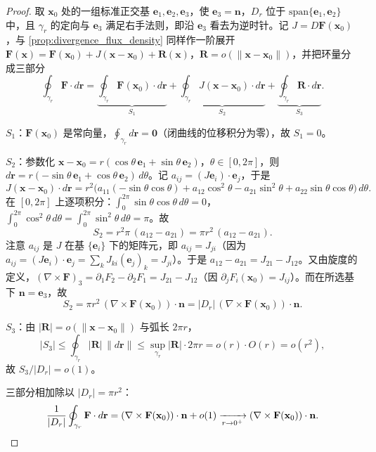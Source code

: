 \begin{proof}
取 $\mathbf x_0$ 处的一组标准正交基 $\mathbf e_1,\mathbf e_2,\mathbf e_3$，使 $\mathbf e_3 = \mathbf n$，$D_r$ 位于 $\mathrm{span}\{\mathbf e_1,\mathbf e_2\}$ 中，且 $\gamma_r$ 的定向与 $\mathbf e_3$ 满足右手法则，即沿 $\mathbf e_3$ 看去为逆时针。记 $J = D\mathbf F(\mathbf x_0)$，与 \cref{prop:divergence_flux_density} 同样作一阶展开
$\mathbf F(\mathbf x) = \mathbf F(\mathbf x_0)+J(\mathbf x-\mathbf x_0)+\mathbf R(\mathbf x)$，$\mathbf R = o(\|\mathbf x-\mathbf x_0\|)$，并把环量分成三部分
\[
\oint_{\gamma_r}\mathbf F\cdot d\mathbf r
= \underbrace{\oint_{\gamma_r}\mathbf F(\mathbf x_0)\cdot d\mathbf r}_{S_1}
+ \underbrace{\oint_{\gamma_r} J(\mathbf x-\mathbf x_0)\cdot d\mathbf r}_{S_2}
+ \underbrace{\oint_{\gamma_r}\mathbf R\cdot d\mathbf r}_{S_3}.
\]

\textbf{$S_1$}：$\mathbf F(\mathbf x_0)$ 是常向量，$\oint_{\gamma_r}d\mathbf r = \mathbf 0$（闭曲线的位移积分为零），故 $S_1 = 0$。

\textbf{$S_2$}：参数化 $\mathbf x-\mathbf x_0 = r(\cos\theta\,\mathbf e_1+\sin\theta\,\mathbf e_2)$，$\theta\in[0,2\pi]$，则 $d\mathbf r = r(-\sin\theta\,\mathbf e_1+\cos\theta\,\mathbf e_2)\,d\theta$。记 $a_{ij} = (J\mathbf e_i)\cdot\mathbf e_j$，于是
\[
J(\mathbf x-\mathbf x_0)\cdot d\mathbf r
= r^2\bigl(a_{11}(-\sin\theta\cos\theta) + a_{12}\cos^2\theta - a_{21}\sin^2\theta + a_{22}\sin\theta\cos\theta\bigr)\,d\theta .
\]
在 $[0,2\pi]$ 上逐项积分：$\int_0^{2\pi}\sin\theta\cos\theta\,d\theta = 0$，$\int_0^{2\pi}\cos^2\theta\,d\theta = \int_0^{2\pi}\sin^2\theta\,d\theta = \pi$。故
\[
S_2 = r^2\pi\,(a_{12}-a_{21}) = \pi r^2\,(a_{12}-a_{21}).
\]
注意 $a_{ij}$ 是 $J$ 在基 $\{\mathbf e_i\}$ 下的矩阵元，即 $a_{ij} = J_{ji}$（因为 $a_{ij}=(J\mathbf e_i)\cdot\mathbf e_j = \sum_k J_{ki}(\mathbf e_j)_k = J_{ji}$）。于是 $a_{12}-a_{21} = J_{21}-J_{12}$。又由旋度的定义，$(\nabla\times\mathbf F)_3 = \partial_1F_2-\partial_2F_1 = J_{21}-J_{12}$（因 $\partial_jF_i(\mathbf x_0)=J_{ij}$）。而在所选基下 $\mathbf n = \mathbf e_3$，故
\[
S_2 = \pi r^2\,(\nabla\times\mathbf F(\mathbf x_0))\cdot\mathbf n = |D_r|\,(\nabla\times\mathbf F(\mathbf x_0))\cdot\mathbf n .
\]

\textbf{$S_3$}：由 $|\mathbf R|=o(\|\mathbf x-\mathbf x_0\|)$ 与弧长 $2\pi r$，
\[
|S_3| \le \oint_{\gamma_r}|\mathbf R|\,\|d\mathbf r\| \le \sup_{\gamma_r}|\mathbf R|\cdot 2\pi r = o(r)\cdot O(r) = o(r^2),
\]
故 $S_3/|D_r| = o(1)$。

三部分相加除以 $|D_r|=\pi r^2$：
\[
\frac{1}{|D_r|}\oint_{\gamma_r}\mathbf F\cdot d\mathbf r
= (\nabla\times\mathbf F(\mathbf x_0))\cdot\mathbf n + o(1)\xrightarrow[r\to0^+]{} (\nabla\times\mathbf F(\mathbf x_0))\cdot\mathbf n. \qedhere
\]
\end{proof}

